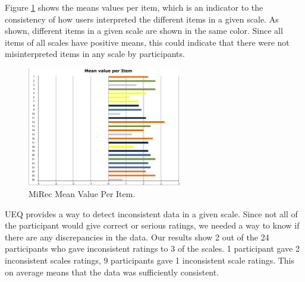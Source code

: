 Figure \ref{fig:figure56} shows the means values per item, which is an indicator
to the consistency of how users interpreted the different items in a given
scale. As shown, different items in a given scale are shown in the same color.
Since all items of all scales have positive means, this could indicate that
there were not misinterpreted items in any scale by participants.\\
\begin{figure}[!htbp]
\centering
\includegraphics[width=0.6\textwidth]{figures/mirec-results3}
\caption{MiRec Mean Value Per Item.}
\label{fig:figure56}
\end{figure}
UEQ provides a way to detect inconsistent data in a given scale. Since not all
of the participant would give correct or serious ratings, we needed a way to
know if there are any discrepancies in the data. Our results show 2 out of
the 24 participants who gave inconsistent ratings to 3 of the scales. 1
participant gave 2 inconsistent scales ratings, 9 participants gave 1
inconsistent scale ratings. This on average means that the data was sufficiently
consistent.

